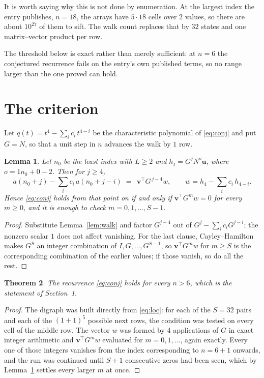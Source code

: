 \documentclass[11pt,a4paper]{article}
\theoremstyle{plain}
\newtheorem{theorem}{Theorem}
\newtheorem{lemma}[theorem]{Lemma}
\theoremstyle{definition}
\begin{document}
It is worth saying why this is not done by enumeration. At the largest index the entry
publishes, $n=18$, the arrays have $5\cdot18$ cells over
$2$ values, so there are about $10^{27}$ of them to sift. The
walk count replaces that by $32$ states and one matrix--vector product per row.

The threshold below is exact rather than merely sufficient: at $n=6$ the conjectured
recurrence fails on the entry's own published terms, so no range larger than the one proved
can hold.
\section{The criterion}

Let $q(t)=t^{4}-\sum_i c_i\,t^{4-i}$ be the characteristic polynomial of
\eqref{eq:conj} and put $G=N$, so that a unit step in $n$ advances the walk by
$1$ row.

\begin{lemma}\label{lem:crit}
Let $n_0$ be the least index with $L\ge2$ and $h_j=G^{j}N^{o}\mathbf{u}$, where
$o=1n_0+0-2$. Then for $j\ge4$,
\[
a(n_0+j)-\sum_i c_i\,a(n_0+j-i)\;=\;\,\mathbf{v}^{\!\top}G^{\,j-4}w,
\qquad w=h_{4}-\sum_i c_i\,h_{4-i} .
\]
Hence \eqref{eq:conj} holds from that point on if and only if
$\mathbf{v}^{\!\top}G^{m}w=0$ for every $m\ge0$, and it is enough to check
$m=0,1,\dots,S-1$.
\end{lemma}

\begin{proof}
Substitute Lemma~\ref{lem:walk} and factor $G^{j-4}$ out of
$G^{j}-\sum_ic_iG^{j-i}$; the nonzero scalar $1$ does not affect
vanishing. For the last clause, Cayley--Hamilton makes $G^{S}$ an integer combination of
$I,G,\dots,G^{S-1}$, so $\mathbf{v}^{\!\top}G^{m}w$ for $m\ge S$ is the corresponding
combination of the earlier values; if those vanish, so do all the rest.
\end{proof}

\begin{theorem}
The recurrence \eqref{eq:conj} holds for every $n>6$, which is the statement of
Section~1.
\end{theorem}

\begin{proof}
The digraph was built directly from \eqref{eq:loc}: for each of the $S=32$ pairs and each
of the $(1+1)^{5}$ possible next rows, the condition was tested on every cell of
the middle row. The vector $w$ was formed by $4$ applications of $G$ in exact integer
arithmetic and $\mathbf{v}^{\!\top}G^{m}w$ evaluated for $m=0,1,\dots$, again exactly.
Every one of those integers vanishes from the index corresponding to $n=6+1$ onwards,
and the run was continued until $S+1$ consecutive zeros had been seen, which by
Lemma~\ref{lem:crit} settles every larger $m$ at once.
\end{proof}
\end{document}
